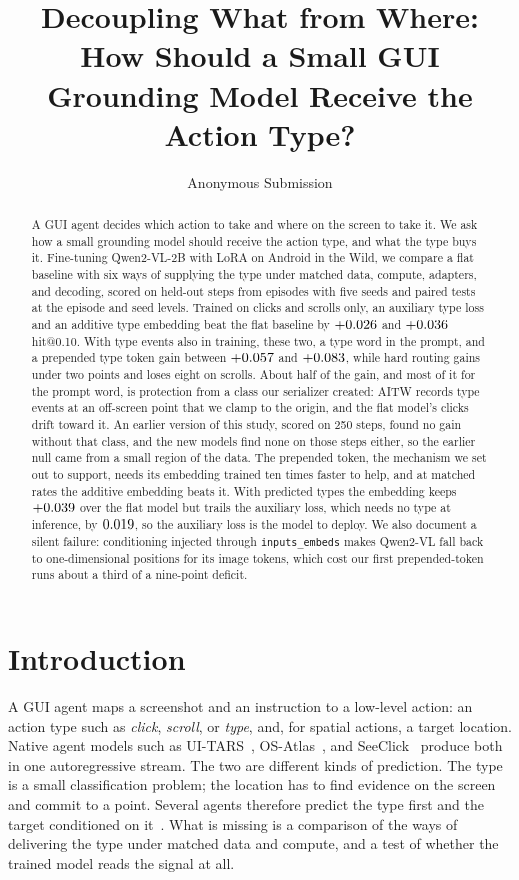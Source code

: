 \documentclass[letterpaper]{article} %
\title{Decoupling What from Where:\\How Should a Small GUI Grounding Model Receive the Action Type?}
\author{Anonymous Submission}
\makeatletter
\newcommand{\hitat}[1]{hit@#1}
\makeatother
\begin{document}
\maketitle

\begin{abstract}
A GUI agent decides which action to take and where on the screen to take it. We ask how a small grounding model should receive the action type, and what the type buys it. Fine-tuning Qwen2-VL-2B with LoRA on Android in the Wild, we compare a flat baseline with six ways of supplying the type under matched data, compute, adapters, and decoding, scored on \nSliceN{} held-out steps from \nSliceEps{} episodes with five seeds and paired tests at the episode and seed levels. Trained on clicks and scrolls only, an auxiliary type loss and an additive type embedding beat the flat baseline by $+0.026$ and $+0.036$ \hitat{0.10}. With type events also in training, these two, a type word in the prompt, and a prepended type token gain between $+0.057$ and $+0.083$, while hard routing gains under two points and loses eight on scrolls. About half of the gain, and most of it for the prompt word, is protection from a class our serializer created: AITW records type events at an off-screen point that we clamp to the origin, and the flat model's clicks drift toward it. An earlier version of this study, scored on 250 steps, found no gain without that class, and the new models find none on those steps either, so the earlier null came from a small region of the data. The prepended token, the mechanism we set out to support, needs its embedding trained ten times faster to help, and at matched rates the additive embedding beats it. With predicted types the embedding keeps $+0.039$ over the flat model but trails the auxiliary loss, which needs no type at inference, by $0.019$, so the auxiliary loss is the model to deploy. We also document a silent failure: conditioning injected through \texttt{inputs\_embeds} makes Qwen2-VL fall back to one-dimensional positions for its image tokens, which cost our first prepended-token runs about a third of a nine-point deficit.
\end{abstract}

\section{Introduction}
\label{sec:intro}

A GUI agent maps a screenshot and an instruction to a low-level action: an action type such as \emph{click}, \emph{scroll}, or \emph{type}, and, for spatial actions, a target location. Native agent models such as UI-TARS~\citep{uitars}, OS-Atlas~\citep{osatlas}, and SeeClick~\citep{seeclick} produce both in one autoregressive stream. The two are different kinds of prediction. The type is a small classification problem; the location has to find evidence on the screen and commit to a point. Several agents therefore predict the type first and the target conditioned on it~\citep{cocoagent,limac,hiagent}. What is missing is a comparison of the ways of delivering the type under matched data and compute, and a test of whether the trained model reads the signal at all.
\end{document}
